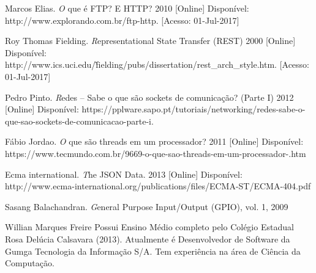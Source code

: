 \documentclass[journal]{IEEEtran}
\begin{document}
\begin{thebibliography}{1}
Marcos Elias. \emph O que é FTP? E HTTP? 2010 [Online]
Disponível: http://www.explorando.com.br/ftp-http. [Acesso: 01-Jul-2017]

Roy Thomas Fielding. \emph Representational State Transfer (REST) 2000 [Online] Disponível: http://www.ics.uci.edu/\~fielding/pubs/dissertation/rest\_arch\_style.htm.
[Acesso: 01-Jul-2017]

Pedro Pinto. \emph Redes – Sabe o que são sockets de comunicação? (Parte I) 2012 [Online] Disponível: https://pplware.sapo.pt/tutoriais/networking/redes-sabe-o-que-sao-sockets-de-comunicacao-parte-i.

Fábio Jordao. \emph O que são threads em um processador? 2011 [Online] Disponível: https://www.tecmundo.com.br/9669-o-que-sao-threads-em-um-processador-.htm

Ecma international. \emph The JSON Data. 2013 [Online] 
Disponível: http://www.ecma-international.org/publications/files/ECMA-ST/ECMA-404.pdf

Sasang Balachandran. \emph General Purpose
Input/Output (GPIO), vol. 1, 2009

\end{thebibliography}

\clearpage

% 

\begin{IEEEbiography}{Willian Marques Freire}
Possui Ensino Médio completo pelo Colégio Estadual Rosa Delúcia Calsavara (2013). Atualmente é Desenvolvedor de Software da Gumga Tecnologia da Informação S/A. Tem experiência na área de Ciência da Computação.
\end{IEEEbiography}
\end{document}
